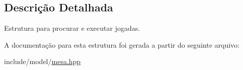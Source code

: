 \subsection{Descrição Detalhada}
Estrutura para procurar e executar jogadas. 

A documentação para esta estrutura foi gerada a partir do seguinte arquivo:\begin{DoxyCompactItemize}
\item 
include/model/\hyperlink{mesa_8hpp}{mesa.hpp}\end{DoxyCompactItemize}

